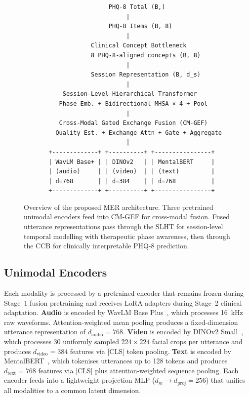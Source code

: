 \documentclass{article}
\begin{document}
\begin{figure}[h]
\centering
\begin{verbatim}
                        PHQ-8 Total (B,)
                             |
                        PHQ-8 Items (B, 8)
                             |
                   Clinical Concept Bottleneck
                   8 PHQ-8-aligned concepts (B, 8)
                             |
                   Session Representation (B, d_s)
                             |
           Session-Level Hierarchical Transformer
          Phase Emb. + Bidirectional MHSA × 4 + Pool
                             |
          Cross-Modal Gated Exchange Fusion (CM-GEF)
         Quality Est. + Exchange Attn + Gate + Aggregate
                             |
       +-------------+ +----------+ +----------------+
       | WavLM Base+ | | DINOv2   | | MentalBERT     |
       | (audio)     | | (video)  | | (text)         |
       | d=768       | | d=384    | | d=768          |
       +-------------+ +----------+ +----------------+
\end{verbatim}
\caption{Overview of the proposed MER architecture. Three pretrained unimodal encoders
feed into CM-GEF for cross-modal fusion. Fused utterance representations pass through
the SLHT for session-level temporal modelling with therapeutic phase awareness,
then through the CCB for clinically interpretable PHQ-8 prediction.}
\label{fig:arch}
\end{figure}

\subsection{Unimodal Encoders}

Each modality is processed by a pretrained encoder that remains frozen during Stage~1
fusion pretraining and receives LoRA adapters during Stage~2 clinical adaptation.
\textbf{Audio} is encoded by WavLM Base Plus~\cite{chen2022wavlm}, which processes 16~kHz
raw waveforms. Attention-weighted mean pooling produces a fixed-dimension utterance
representation of $d_{\text{audio}} = 768$. \textbf{Video} is encoded by DINOv2
Small~\cite{oquab2023dinov2}, which processes 30 uniformly sampled $224\times224$ facial
crops per utterance and produces $d_{\text{video}} = 384$ features via [CLS] token
pooling. \textbf{Text} is encoded by MentalBERT~\cite{ji2022mentalbert}, which tokenises
utterances up to 128 tokens and produces $d_{\text{text}} = 768$ features via [CLS] plus
attention-weighted sequence pooling. Each encoder feeds into a lightweight projection MLP
($d_m \to d_{\text{proj}} = 256$) that unifies all modalities to a common latent
dimension.
\end{document}
